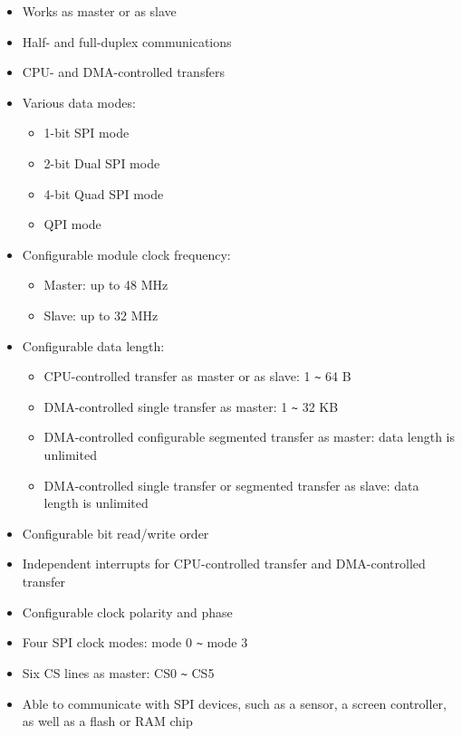 \documentclass[main\_\_EN.tex]{subfiles}
\begin{document}
\begin{itemize}
    \item Works as master or as slave
    \item Half- and full-duplex communications
    \item CPU- and DMA-controlled transfers
    \item Various data modes:
        \begin{itemize}
            \item 1-bit SPI mode
            \item 2-bit Dual SPI mode
            \item 4-bit Quad SPI mode
            \item QPI mode
        \end{itemize}
    \item Configurable module clock frequency:
        \begin{itemize}
            \item Master: up to 48 MHz
            \item Slave: up to 32 MHz
        \end{itemize}
    \item Configurable data length:
    \begin{itemize}
        \item CPU-controlled transfer as master or as slave: 1 \verb+~+ 64 B
        \item DMA-controlled single transfer as master: 1 \verb+~+ 32 KB
        \item DMA-controlled configurable segmented transfer as master: data length is unlimited
        \item DMA-controlled single transfer or segmented transfer as slave: data length is unlimited
    \end{itemize}
    \item Configurable bit read/write order
    \item Independent interrupts for CPU-controlled transfer and DMA-controlled transfer
    \item Configurable clock polarity and phase
    \item Four SPI clock modes: mode 0 \verb+~+ mode 3
    \item Six CS lines as master: CS0 \verb+~+ CS5
    \item Able to communicate with SPI devices, such as a sensor, a screen controller, as well as a flash or RAM chip
\end{itemize}
\end{document}
